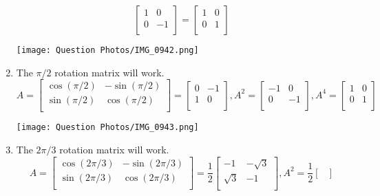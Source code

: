 \begin{SaveQuestion}
\begin{enumerate}
$$\begin{bmatrix}
	1 & 0 \\
	0 & -1 \\
	\end{bmatrix}
        =
            \begin{bmatrix} 
	1 & 0 \\
	0 & 1 \\
	\end{bmatrix}$$
    \begin{center}
        \texttt{[image: Question Photos/IMG\_0942.png]}
        \end{center}
    \item The $\pi / 2$ rotation matrix will work.
        \\
        $$A = 
        \begin{bmatrix} 
	\cos(\pi /2) & -\sin(\pi / 2) \\
	\sin(\pi / 2) & \cos(\pi / 2) \\
	\end{bmatrix}
        =
        \begin{bmatrix} 
	0 & -1 \\
	1 & 0 \\
	\end{bmatrix}, 
        A^2 =
        \begin{bmatrix} 
	-1 & 0 \\
	0 & -1 \\
	\end{bmatrix}, 
        A^4 = 
        \begin{bmatrix} 
	1 & 0 \\
	0 & 1 \\
	\end{bmatrix}$$
 \begin{center}
        \texttt{[image: Question Photos/IMG\_0943.png]}
        \end{center}
    \item The $2\pi / 3$ rotation matrix will work. \\
        $$A=
        \begin{bmatrix} 
	\cos(2\pi / 3) & -\sin(2\pi /3) \\
	\sin(2\pi /3) & \cos(2\pi /3) \\
	\end{bmatrix}
        = \frac{1}{2}
        \begin{bmatrix} 
	-1 & -\sqrt{3} \\
	\sqrt{3} & -1 \\
	\end{bmatrix},
        A^2 = \frac{1}{2}
        \begin{bmatrix} 

\end{bmatrix}$$
\end{enumerate}
\end{SaveQuestion}
